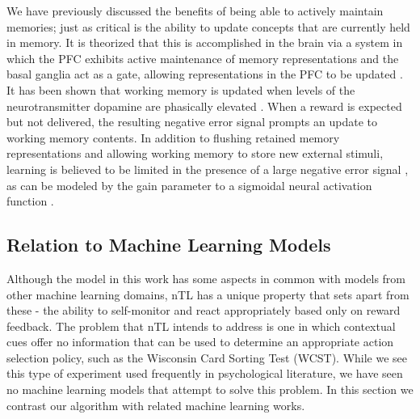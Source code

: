 \documentclass[10pt,letterpaper]{article}
\begin{document}
We have previously discussed the benefits of being able to actively maintain memories; just as critical is the ability to update concepts that are currently held in memory. It is theorized that this is accomplished in the brain via a system in which the PFC exhibits active maintenance of memory representations and the basal ganglia act as a gate, allowing representations in the PFC to be updated \cite{frank_interactions_2001,chatham_multiple_2015,chatham_corticostriatal_2014,rougier_prefrontal_2005,kriete_indirection_2013,kriete_generalisation_2011}. It has been shown that working memory is updated when levels of the neurotransmitter dopamine are phasically elevated \cite{frank_interactions_2001,chatham_multiple_2015,kriete_generalisation_2011,rougier_prefrontal_2005,niv_reinforcement_2015}. When a reward is expected but not delivered, the resulting negative error signal prompts an update to working memory contents. In addition to flushing retained memory representations and allowing working memory to store new external stimuli, learning is believed to be limited in the presence of a large negative error signal \cite{chatham_multiple_2015,oreilly_biologically_2006}, as can be modeled by the gain parameter to a sigmoidal neural activation function \cite{frank_interactions_2001,oreilly_making_2006}.

\subsection{Relation to Machine Learning Models}

Although the model in this work has some aspects in common with models from other machine learning domains, nTL has a unique property that sets apart from these - the ability to self-monitor and react appropriately based only on reward feedback. The problem that nTL intends to address is one in which contextual cues offer no information that can be used to determine an appropriate action selection policy, such as the Wisconsin Card Sorting Test (WCST). While we see this type of experiment used frequently in psychological literature, we have seen no machine learning models that attempt to solve this problem. In this section we contrast our algorithm with related machine learning works.
\end{document}
